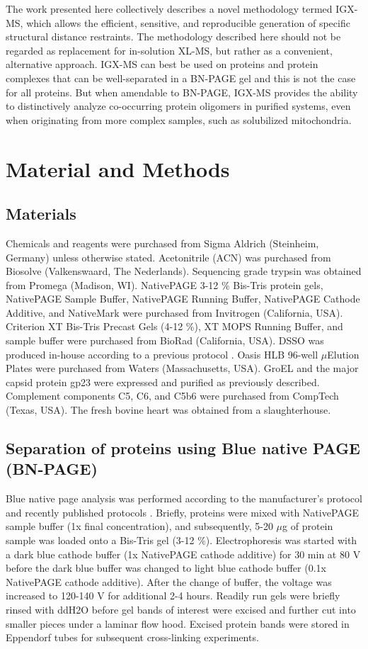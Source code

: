 The work presented here collectively describes a novel methodology termed IGX-MS, which allows the efficient, sensitive, and reproducible generation of specific structural distance restraints. The methodology described here should not be regarded as replacement for in-solution XL-MS, but rather as a convenient, alternative approach. IGX-MS can best be used on proteins and protein complexes that can be well-separated in a BN-PAGE gel and this is not the case for all proteins. But when amendable to BN-PAGE, IGX-MS provides the ability to distinctively analyze co-occurring protein oligomers in purified systems, even when originating from more complex samples, such as solubilized mitochondria.
%
\section{Material and Methods}
\subsection*{Materials}
Chemicals and reagents were purchased from Sigma Aldrich (Steinheim, Germany) unless otherwise stated. Acetonitrile (ACN) was purchased from Biosolve (Valkenswaard, The Nederlands). Sequencing grade trypsin was obtained from Promega (Madison, WI). NativePAGE 3-12 \% Bis-Tris protein gels, NativePAGE Sample Buffer, NativePAGE Running Buffer, NativePAGE Cathode Additive, and NativeMark were purchased from Invitrogen (California, USA). Criterion XT Bis-Tris Precast Gels (4-12 \%), XT MOPS Running Buffer, and sample buffer were purchased from BioRad (California, USA). DSSO was produced in-house according to a previous protocol \cite{Kao_2011}. Oasis HLB 96-well $\mu$Elution Plates were purchased from Waters (Massachusetts, USA). GroEL and the major capsid protein gp23 were expressed and purified as previously described. \cite{Quaite-Randall_2000, van_Duijn_2005, van_Duijn_2006} Complement components C5, C6, and C5b6 were purchased from CompTech (Texas, USA). The fresh bovine heart was obtained from a slaughterhouse.
%
\subsection*{Separation of proteins using Blue native PAGE (BN-PAGE)}
Blue native page analysis was performed according to the manufacturer's protocol and recently published protocols \cite{Wittig_2006}. Briefly, proteins were mixed with NativePAGE sample buffer (1x final concentration), and subsequently, 5-20 $\mu$g of protein sample was loaded onto a Bis-Tris gel (3-12 \%). Electrophoresis was started with a dark blue cathode buffer (1x NativePAGE cathode additive) for 30 min at 80 V before the dark blue buffer was changed to light blue cathode buffer (0.1x NativePAGE cathode additive). After the change of buffer, the voltage was increased to 120-140 V for additional 2-4 hours. Readily run gels were briefly rinsed with ddH2O before gel bands of interest were excised and further cut into smaller pieces under a laminar flow hood. Excised protein bands were stored in Eppendorf tubes for subsequent cross-linking experiments.
